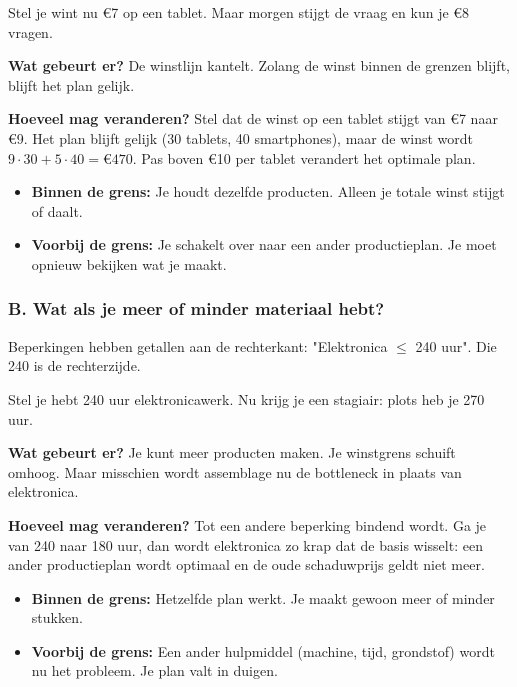 \documentclass[a4paper,11pt]{article}
\begin{document}
Stel je wint nu €7 op een tablet. Maar morgen stijgt de vraag en kun je €8 vragen.

\textbf{Wat gebeurt er?} De winstlijn kantelt. Zolang de winst binnen de grenzen blijft, blijft het plan gelijk.

\textbf{Hoeveel mag veranderen?} Stel dat de winst op een tablet stijgt van €7 naar €9. Het plan blijft gelijk (30 tablets, 40 smartphones), maar de winst wordt $9 \cdot 30 + 5 \cdot 40 = €470$. Pas boven €10 per tablet verandert het optimale plan.

\begin{itemize}
    \item \textbf{Binnen de grens:} Je houdt dezelfde producten. Alleen je totale winst stijgt of daalt.
    \item \textbf{Voorbij de grens:} Je schakelt over naar een ander productieplan. Je moet opnieuw bekijken wat je maakt.
\end{itemize}

\subsubsection{B. Wat als je meer of minder materiaal hebt?}

\begin{theorieblok}
    Beperkingen hebben getallen aan de rechterkant: "Elektronica $\leq$ 240 uur". Die 240 is de rechterzijde.
\end{theorieblok}

Stel je hebt 240 uur elektronicawerk. Nu krijg je een stagiair: plots heb je 270 uur.

\textbf{Wat gebeurt er?} Je kunt meer producten maken.
Je winstgrens schuift omhoog. Maar misschien wordt assemblage nu de bottleneck in plaats van elektronica.

\textbf{Hoeveel mag veranderen?} Tot een andere beperking bindend wordt. Ga je van 240 naar 180 uur, dan wordt elektronica zo krap dat de basis wisselt: een ander productieplan wordt optimaal en de oude schaduwprijs geldt niet meer.

\begin{itemize}
    \item \textbf{Binnen de grens:} Hetzelfde plan werkt. Je maakt gewoon meer of minder stukken.
    \item \textbf{Voorbij de grens:} Een ander hulpmiddel (machine, tijd, grondstof) wordt nu het probleem. Je plan valt in duigen.
\end{itemize}
\end{document}
